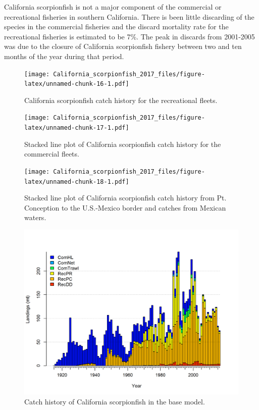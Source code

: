 \documentclass[12pt,]{article}
\begin{document}
California scorpionfish is not a major component of the commercial or
recreational fisheries in southern California. There is been little
discarding of the species in the commercial fisheries and the discard
mortality rate for the recreational fisheries is estimated to be 7\%.
The peak in discards from 2001-2005 was due to the closure of California
scorpionfish fishery between two and ten months of the year during that
period.

\FloatBarrier

\begin{figure}[htbp]
\centering
\texttt{[image: California\_scorpionfish\_2017\_files/figure-latex/unnamed-chunk-16-1.pdf]}
\caption{California scorpionfish catch history for the recreational
fleets. \label{fig:Exec_catch1}}
\end{figure}

\begin{figure}[htbp]
\centering
\texttt{[image: California\_scorpionfish\_2017\_files/figure-latex/unnamed-chunk-17-1.pdf]}
\caption{Stacked line plot of California scorpionfish catch history for
the commercial fleets. \label{fig:Exec_catch2}}
\end{figure}

\begin{figure}[htbp]
\centering
\texttt{[image: California\_scorpionfish\_2017\_files/figure-latex/unnamed-chunk-18-1.pdf]}
\caption{Stacked line plot of California scorpionfish catch history from
Pt. Conception to the U.S.-Mexico border and catches from Mexican
waters. \label{fig:Exec_catch3}}
\end{figure}

\FloatBarrier

\begin{figure}[htbp]
\centering
\includegraphics{r4ss/plots_mod1/catch2 landings stacked.png}
\caption{Catch history of California scorpionfish in the base model.
\label{fig:r4ss_catches}}
\end{figure}
\end{document}
